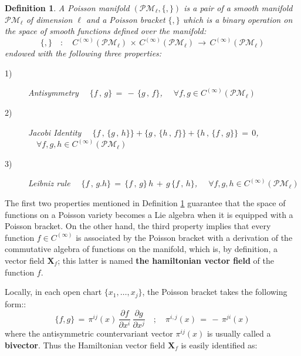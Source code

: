 \documentclass[10pt,a4paper]{article}
\newtheorem{definizione}{Definition}[section]
\begin{document}
\begin{definizione}
\label{poissone} A Poisson manifold
$\left(\mathcal{PM}_\ell,\{,\}\right)$  is a pair of a smooth
manifold $\mathcal{PM}_\ell$ of dimension $\ell$ and a Poisson bracket
 $\{,\}$  which  is a binary operation
on the space of smooth functions defined over the manifold:
\begin{equation}\label{pesceparente}
    \{,\} \quad : \quad C^{(\infty)} \left(\mathcal{PM}_\ell\right)
    \, \times \, C^{(\infty)} \left(\mathcal{PM}_\ell\right)\,
    \longrightarrow \, C^{(\infty)} \left(\mathcal{PM}_\ell\right)
\end{equation}
endowed with the following three properties:
\begin{description}
  \item[1)] Antisymmetry $\quad \{f\, ,\, g\} \, = \, - \, \{g\, ,\, f\}
  $, $\quad\forall f,g \in C^{(\infty)} \left(\mathcal{PM}_\ell\right)$
  \item[2)] Jacobi Identity $\quad \{f\, , \, \{g \, ,\, h\}\}+\{g\, , \, \{h \, ,\, f\}\}+\{h\, , \, \{f \, ,\, g\}\}\, = \,
  0$, $\quad \forall f,g,h \in C^{(\infty)} \left(\mathcal{PM}_\ell\right)$
  \item[3)] Leibniz rule $\quad \{f\, , \, g.h\} \, = \, \{f\, , \,
  g\} \, h \, + \, g \,\{f\, , \,
  h\}$,  $\quad \forall f,g,h \in C^{(\infty)} \left(\mathcal{PM}_\ell\right)$
\end{description}
\end{definizione}
The first two properties mentioned in Definition
\ref{poissone} guarantee that the space of functions on a Poisson variety becomes a Lie algebra when it is equipped with a Poisson bracket. On the other hand, the third property implies that every function $f \in
C^{(\infty)}$ is associated by the Poisson bracket with a derivation of the commutative algebra of functions on the manifold, which is, by definition, a vector field
$\mathbf{X}_f$; this latter is named  \textbf{the hamiltonian vector field} of the function $f$.
\par
Locally, in each open chart $\{x_1,\dots,x_j\}$, the Poisson bracket takes the following form::
\begin{equation}\label{localedelpesce}
    \{f,g\} \, = \,\pi^{ij}(x)\,\frac{\partial f}{\partial x^i}\, \frac{\partial g}{\partial
    x^j} \quad ; \quad \pi^{i,j}(x) \, = \, - \, \pi^{ji}(x)
\end{equation}
where the antisymmetric countervariant vector $\pi^{ij}(x)$ is usually called a \textbf{bivector}.
Thus the Hamiltonian vector field $\mathbf{X}_f$ is easily identified as:
\end{document}
